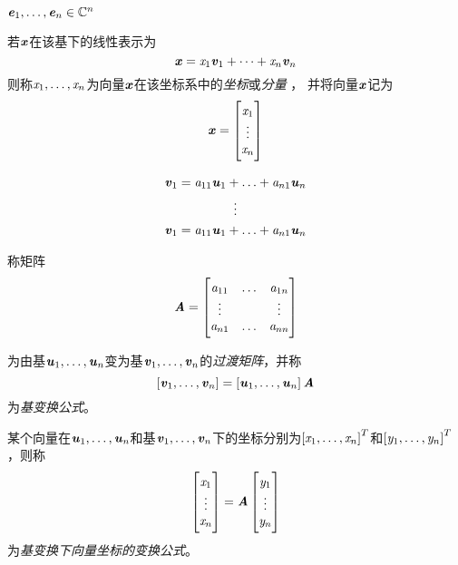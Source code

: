\begin{definition}[基]

    $\Ve_1, \ldots, \Ve_n \in \SetC^n$

    若$\Vx$在该基下的线性表示为
    \[
        \Vx = \Sx_1 \Vv_1 + \cdots + \Sx_n\Vv_n
    \]
则称$\Sx_1, \ldots, \Sx_n$为向量$\Vx$在该坐标系中的\emph{坐标}或\emph{分量} ， 并将向量$\Vx$记为
    \[
        \Vx = \begin{bmatrix}
            \Sx_1  \\
            \vdots \\
            \Sx_n  \\
        \end{bmatrix}
    \]

\begin{gather}
    \Vv_1 = \Sa_{11}\Vu_1 + \ldots + \Sa_{n1}\Vu_n \\
        \vdots \\
        \Vv_1 = \Sa_{11}\Vu_1 + \ldots + \Sa_{n1}\Vu_n
\end{gather}

    称矩阵
    \[
        \MA = \begin{bmatrix}
            \Sa_{11} & \ldots & \Sa_{1n} \\
            \vdots   &        & \vdots   \\
            \Sa_{n1} & \ldots & \Sa_{nn}
        \end{bmatrix}
    \]

为由基$\Vu_1, \ldots, \Vu_n$变为基$\Vv_1, \ldots, \Vv_n$的\emph{过渡矩阵}，并称
    \[
        \left[\Vv_1, \ldots, \Vv_n\right] = \left[\Vu_1, \ldots, \Vu_n \right] \MA
    \]
为\emph{基变换公式}。

    某个向量在$\Vu_1, \ldots, \Vu_n$和基$\Vv_1, \ldots, \Vv_n$下的坐标分别为$\left[\Sx_1, \ldots, \Sx_n \right]^T$和$\left[\Sy_1, \ldots, \Sy_n \right]^T$，则称
    \[
        \begin{bmatrix}
            \Sx_1 \\
            \vdots \\
            \Sx_n
        \end{bmatrix} = \MA \begin{bmatrix}
            \Sy_1 \\
            \vdots \\
            \Sy_n
        \end{bmatrix}
    \]
为\emph{基变换下向量坐标的变换公式}。

\end{definition}

